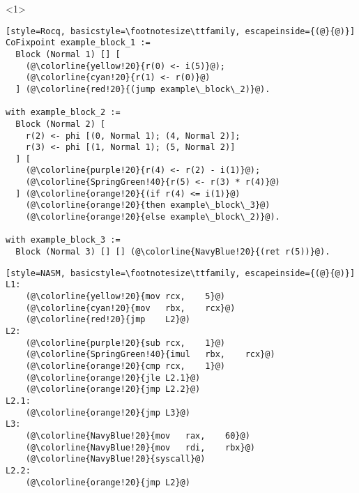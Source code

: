 
\begin{onlyenv}<1>
\begin{minipage}{0.58\linewidth}
\begin{lstlisting}[style=Rocq, basicstyle=\footnotesize\ttfamily, escapeinside={(@}{@)}]
CoFixpoint example_block_1 :=
  Block (Normal 1) [] [
    (@\colorline{yellow!20}{r(0) <- i(5)}@);
    (@\colorline{cyan!20}{r(1) <- r(0)}@)
  ] (@\colorline{red!20}{(jump example\_block\_2)}@).

with example_block_2 :=
  Block (Normal 2) [
    r(2) <- phi [(0, Normal 1); (4, Normal 2)];
    r(3) <- phi [(1, Normal 1); (5, Normal 2)]
  ] [
    (@\colorline{purple!20}{r(4) <- r(2) - i(1)}@);
    (@\colorline{SpringGreen!40}{r(5) <- r(3) * r(4)}@)
  ] (@\colorline{orange!20}{(if r(4) <= i(1)}@)
    (@\colorline{orange!20}{then example\_block\_3}@)
    (@\colorline{orange!20}{else example\_block\_2)}@).

with example_block_3 :=
  Block (Normal 3) [] [] (@\colorline{NavyBlue!20}{(ret r(5))}@).
\end{lstlisting}
\end{minipage}
\hfill
\begin{minipage}{0.38\linewidth}
\begin{lstlisting}[style=NASM, basicstyle=\footnotesize\ttfamily, escapeinside={(@}{@)}]
L1:
	(@\colorline{yellow!20}{mov	rcx,	5}@)
	(@\colorline{cyan!20}{mov	rbx,	rcx}@)
	(@\colorline{red!20}{jmp	L2}@)
L2:
	(@\colorline{purple!20}{sub	rcx,	1}@)
	(@\colorline{SpringGreen!40}{imul	rbx,	rcx}@)
	(@\colorline{orange!20}{cmp	rcx,	1}@)
	(@\colorline{orange!20}{jle	L2.1}@)
	(@\colorline{orange!20}{jmp	L2.2}@)
L2.1:
	(@\colorline{orange!20}{jmp	L3}@)
L3:
	(@\colorline{NavyBlue!20}{mov	rax,	60}@)
	(@\colorline{NavyBlue!20}{mov	rdi,	rbx}@)
	(@\colorline{NavyBlue!20}{syscall}@)
L2.2:
	(@\colorline{orange!20}{jmp	L2}@)
\end{lstlisting}
\end{minipage}
\end{onlyenv}